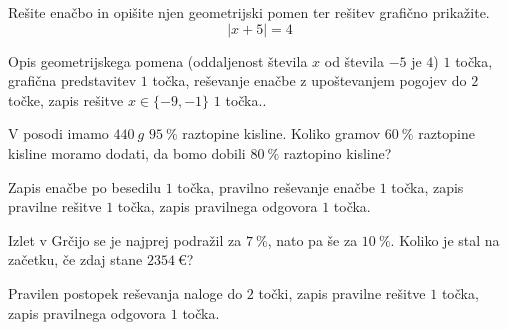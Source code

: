 \documentclass[addpoints]{exam}
\begin{document}
\begin{questions}
    \question[5]
    Rešite enačbo in opišite njen geometrijski pomen ter rešitev grafično prikažite.
    $$  \left\lvert x+5\right\rvert=4 $$
    
    
    \begin{solution}[8cm]
        Opis geometrijskega pomena (oddaljenost števila $x$ od števila $-5$ je $4$) $1$ točka, grafična predstavitev $1$ točka, reševanje enačbe z upoštevanjem pogojev do $2$ točke, zapis rešitve $x\in\{-9,-1\}$ $1$ točka..
    \end{solution}







    
    

    \newpage

    \question[4]
    V posodi imamo $440~g$ $95~\%$ raztopine kisline. Koliko gramov $60~\%$ raztopine kisline moramo dodati, da bomo dobili $80~\%$ raztopino kisline?
    
    
    \begin{solution}[10cm]
        Zapis enačbe po besedilu $1$ točka, pravilno reševanje enačbe $1$ točka, zapis pravilne rešitve $1$ točka, zapis pravilnega odgovora $1$ točka.
    \end{solution}




    \question[4]
    Izlet v Grčijo se je najprej podražil za $7~\%$, nato pa še za $10~\%$. 
    Koliko je stal na začetku, če zdaj stane $2354~€$?
    
    
    \begin{solution}[3cm]
        Pravilen postopek reševanja naloge do $2$ točki, zapis pravilne rešitve $1$ točka, zapis pravilnega odgovora $1$ točka.
    \end{solution}

     \newpage



    

\end{questions}
\end{document}
